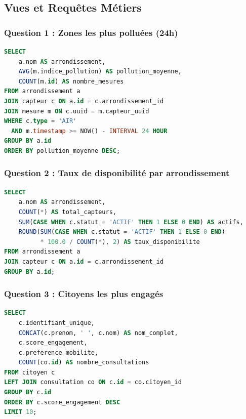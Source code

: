 \documentclass[12pt,a4paper]{article}
\begin{document}
\subsection{Vues et Requêtes Métiers}

\subsubsection{Question 1 : Zones les plus polluées (24h)}

\begin{lstlisting}[language=SQL]
SELECT 
    a.nom AS arrondissement,
    AVG(m.indice_pollution) AS pollution_moyenne,
    COUNT(m.id) AS nombre_mesures
FROM arrondissement a
JOIN capteur c ON a.id = c.arrondissement_id
JOIN mesure m ON c.uuid = m.capteur_uuid
WHERE c.type = 'AIR'
  AND m.timestamp >= NOW() - INTERVAL 24 HOUR
GROUP BY a.id
ORDER BY pollution_moyenne DESC;
\end{lstlisting}

\subsubsection{Question 2 : Taux de disponibilité par arrondissement}

\begin{lstlisting}[language=SQL]
SELECT 
    a.nom AS arrondissement,
    COUNT(*) AS total_capteurs,
    SUM(CASE WHEN c.statut = 'ACTIF' THEN 1 ELSE 0 END) AS actifs,
    ROUND(SUM(CASE WHEN c.statut = 'ACTIF' THEN 1 ELSE 0 END) 
          * 100.0 / COUNT(*), 2) AS taux_disponibilite
FROM arrondissement a
JOIN capteur c ON a.id = c.arrondissement_id
GROUP BY a.id;
\end{lstlisting}

\subsubsection{Question 3 : Citoyens les plus engagés}

\begin{lstlisting}[language=SQL]
SELECT 
    c.identifiant_unique,
    CONCAT(c.prenom, ' ', c.nom) AS nom_complet,
    c.score_engagement,
    c.preference_mobilite,
    COUNT(co.id) AS nombre_consultations
FROM citoyen c
LEFT JOIN consultation co ON c.id = co.citoyen_id
GROUP BY c.id
ORDER BY c.score_engagement DESC
LIMIT 10;
\end{lstlisting}
\end{document}
